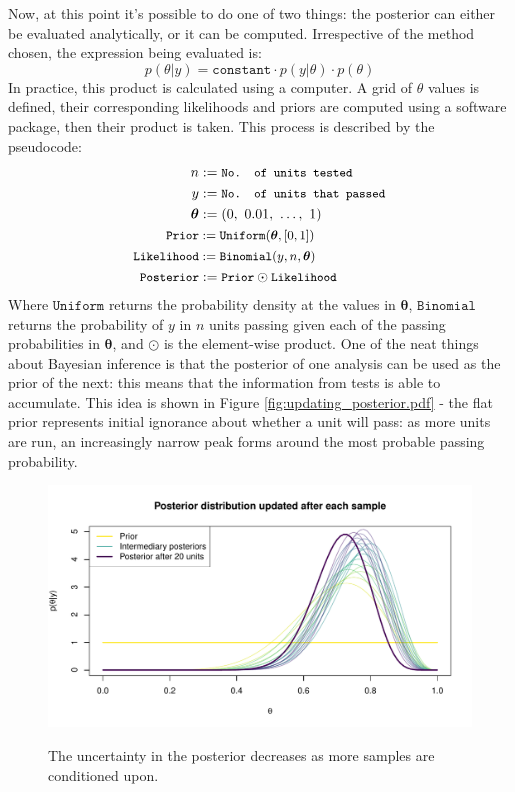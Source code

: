 \documentclass[11pt,a4paper,article]{memoir} %
\begin{document}
Now, at this point it's possible to do one of two things: the posterior can either be evaluated analytically, or it can be computed. Irrespective of the method chosen, the expression being evaluated is:
\begin{equation}
	p(\theta|y) = \texttt{constant}\cdot p(y|\theta) \cdot p(\theta)
\end{equation}
In practice, this product is calculated using a computer. A grid of $\theta$ values is defined, their corresponding likelihoods and priors are computed using a software package, then their product is taken. This process is described by the pseudocode:
\begin{align}
  \quad n &:= \small{\texttt{No. of units tested}} \\
   \quad y &:= \small{\texttt{No. of units that passed}} \\
  \boldsymbol{\theta} & := (0, \ 0.01, \ \dots, \ 1) \\
  \small{\texttt{Prior}} &:= \small{\texttt{Uniform}}(\boldsymbol{\theta}, [0, 1]) \\
  \small{\texttt{Likelihood}} &:= \small{\texttt{Binomial}}(y, n, \boldsymbol{\theta}) \\ 
  \small{\texttt{Posterior}} &:= \small{\texttt{Prior} \odot \texttt{Likelihood}}
\end{align}
Where $\texttt{Uniform}$ returns the probability density at the values in $\boldsymbol{\theta}$, $\texttt{Binomial}$ returns the probability of $y$ in $n$ units passing given each of the passing probabilities in $\boldsymbol{\theta}$, and $\odot$ is the element-wise product.
One of the neat things about Bayesian inference is that the posterior of one analysis can be used as the prior of the next: this means that the information from tests is able to accumulate. This idea is shown in Figure \ref{fig:updating_posterior.pdf} - the flat prior represents initial ignorance about whether a unit will pass: as more units are run, an increasingly narrow peak forms around the most probable passing probability.
\begin{figure}
\includegraphics[width=\textwidth]{updating_posterior.pdf}
\label{fig:updating_posterior}
\caption{The uncertainty in the posterior decreases as more samples are conditioned upon.}
\end{figure}
\end{document}
